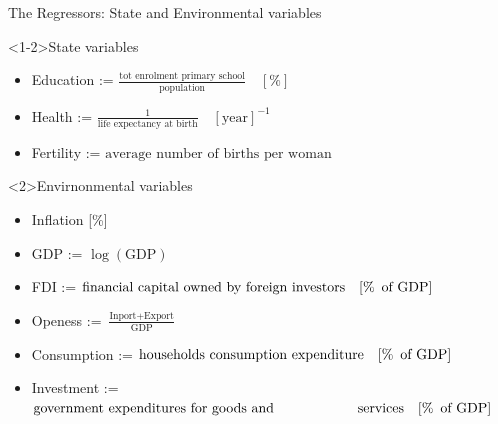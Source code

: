 \documentclass[9pt]{beamer}
\begin{document}
\begin{frame}{The Regressors: State and Environmental variables}
	\begin{block}<1-2>{State variables}
		\begin{itemize}
			\item  Education := $\frac{\text{tot enrolment primary school}}{\text{population}} \quad [\%]$
			\item Health := $\frac{1}{\text{life expectancy at birth}} \quad [\text{year}]^{-1}$
			\item Fertility := $\text{average number of births per woman}$
		\end{itemize}
		
	\end{block}
	\begin{block}{Envirnonmental variables}
		\begin{itemize}
			\item Inflation [\%]
			\item GDP := $ \log(\text{GDP}) $
			\item FDI := $\text{financial capital owned by foreign investors} \quad [\% \enskip   \text{of GDP}]$
			\item Openess := $\frac{\text{Inport} + \text{Export}}{\text{GDP}}$
			\item Consumption := $\text{households consumption expenditure} \quad [\% \enskip   \text{of GDP}] $

			\item Investment := $\text{government expenditures for goods and} \newline \hspace*{2cm}\text{ services} \quad [\% \enskip   \text{of GDP}]$
		\end{itemize}
	\end{block}
\end{frame}
\end{document}
